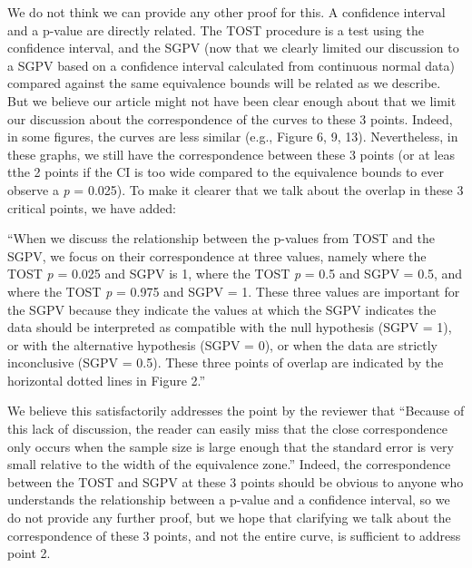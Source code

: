 \documentclass[man]{apa6}
\begin{document}
We do not think we can provide any other proof for this. A confidence
interval and a p-value are directly related. The TOST procedure is a
test using the confidence interval, and the SGPV (now that we clearly
limited our discussion to a SGPV based on a confidence interval
calculated from continuous normal data) compared against the same
equivalence bounds will be related as we describe. But we believe our
article might not have been clear enough about that we limit our
discussion about the correspondence of the curves to these 3 points.
Indeed, in some figures, the curves are less similar (e.g., Figure 6, 9,
13). Nevertheless, in these graphs, we still have the correspondence
between these 3 points (or at leas tthe 2 points if the CI is too wide
compared to the equivalence bounds to ever observe a \emph{p} = 0.025).
To make it clearer that we talk about the overlap in these 3 critical
points, we have added:

\enquote{When we discuss the relationship between the p-values from TOST
and the SGPV, we focus on their correspondence at three values, namely
where the TOST \emph{p} = 0.025 and SGPV is 1, where the TOST \emph{p} =
0.5 and SGPV = 0.5, and where the TOST \emph{p} = 0.975 and SGPV = 1.
These three values are important for the SGPV because they indicate the
values at which the SGPV indicates the data should be interpreted as
compatible with the null hypothesis (SGPV = 1), or with the alternative
hypothesis (SGPV = 0), or when the data are strictly inconclusive (SGPV
= 0.5). These three points of overlap are indicated by the horizontal
dotted lines in Figure 2.}

We believe this satisfactorily addresses the point by the reviewer that
\enquote{Because of this lack of discussion, the reader can easily miss
that the close correspondence only occurs when the sample size is large
enough that the standard error is very small relative to the width of
the equivalence zone.} Indeed, the correspondence between the TOST and
SGPV at these 3 points should be obvious to anyone who understands the
relationship between a p-value and a confidence interval, so we do not
provide any further proof, but we hope that clarifying we talk about the
correspondence of these 3 points, and not the entire curve, is
sufficient to address point 2.
\end{document}
